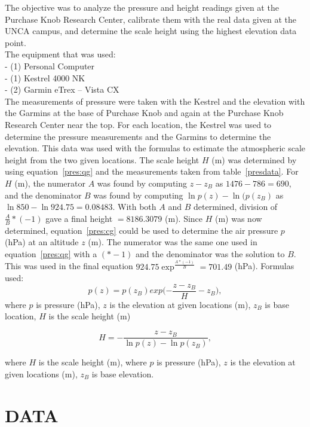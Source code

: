\documentclass[twocolumn]{article}
\begin{document}
The objective was to analyze the pressure and height readings given at the Purchase Knob Research Center, calibrate them with the real data given at the UNCA campus, and determine the scale height using the highest elevation data point.\\
The equipment that was used:\\
-	(1) Personal Computer\\
-	(1) Kestrel 4000 NK\\
-	(2) Garmin eTrex – Vista CX\\
The measurements of pressure were taken with the Kestrel and the elevation with the Garmins at the base of Purchase Knob and again at the Purchase Knob Research Center near the top. For each location, the Kestrel was used to determine the pressure measurements and the Garmins to determine the elevation. This data was used with the formulas to estimate the atmospheric scale height from the two given locations. 
The scale height $H$ (m) was determined by using equation~\ref{pres:qg} and the measurements taken from table~\ref{presdata}. For $H$ (m), the numerator $A$ was found by computing $z-z_B$ as $1476-786=690$, and the denominator $B$ was found by computing $\ln{p(z)}-\ln{(p(z_B)}$ as $\ln{850}-\ln{924.75}=0.08483$. With both $A$ and $B$ determined, division of $\frac{A}{B}*(-1)$ gave a final height $=8186.3079$ (m). Since $H$ (m) was now determined, equation~\ref{pres:cg} could be used to determine the air pressure $p$ (hPa) at an altitude $z$ (m). The numerator was the same one used in equation~\ref{pres:qg} with a $(*-1)$ and the denominator was the solution to $B$. This was used in the final equation $924.75\exp^{\frac{A*(-1)}{B}} = 701.49$ (hPa).
Formulas used:
\begin{equation}\label{pres:cg}
p(z)=p(z_B)exp({-\frac{z-z_B}{H}-z_B)},
\end{equation}
where $p$ is pressure (hPa), $z$ is the elevation at given locations (m), $z_B$ is base location, $H$ is  the scale height (m)

\begin{equation}\label{pres:qg}
H={-\frac{z-z_B}{\ln{p(z)}-\ln{p(z_B)}}},
\end{equation}

where $H$ is the scale height (m), where $p$ is pressure (hPa), $z$ is the elevation at given locations (m), $z_B$ is base elevation.

\section{{\normalsize \hspace{-0.195in} {\textbf{
DATA
}}}} \vspace{-1.6mm}
\end{document}
